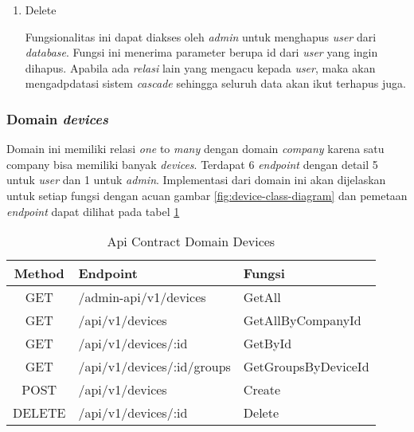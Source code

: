 \begin{enumerate}
        Fungsionalitas ini menerima masukan berupa json yang dengan \textit{field} \textit{name}, \textit{email}, \textit{password}, serta \textit{company\textunderscore id} dari \textit{requester}. Seluruh \textit{field} tersebut digunakan untuk membuat objek user pada \textit{database}. Pada fungsi ini akan dilakukan pengecekan apakah \textit{email} valid dan \textit{unique}. Selain itu ada validasi \textit{company\textunderscore id} agar dipastikan bahwa \textit{user} benar terdaftar ke \textit{company} yang sesuai. Apabila validasi tidak berhasil maka akan dikeluarkan pesan error, namun jika semua berhasil dilewati maka akan dikembalikan \textit{response} berupa \textit{user} yang telah dibuat pada database.

  \item Delete

        Fungsionalitas ini dapat diakses oleh \textit{admin} untuk menghapus \textit{user} dari \textit{database}. Fungsi ini menerima parameter berupa id dari \textit{user} yang ingin dihapus. Apabila ada \textit{relasi} lain yang mengacu kepada \textit{user}, maka akan mengadpdatasi sistem \textit{cascade} sehingga seluruh data akan ikut terhapus juga.

\end{enumerate}

\subsubsection{Domain \textit{devices}}

Domain ini memiliki relasi \textit{one} to \textit{many} dengan domain \textit{company} karena satu company bisa memiliki banyak \textit{devices}. Terdapat 6 \textit{endpoint} dengan detail 5 untuk \textit{user} dan 1 untuk \textit{admin}. Implementasi dari domain ini akan dijelaskan untuk setiap fungsi dengan acuan gambar \ref{fig:device-class-diagram} dan pemetaan \textit{endpoint} dapat dilihat pada tabel \ref{tab:api-contract-domain-device}

\bgroup
\begin{table}[ht]
  \caption{Api Contract Domain Devices}
  \label{tab:api-contract-domain-device}
  \def\arraystretch{1.7}
  \centering
  \begin{tabular}{|c|p{6cm}|p{4cm}|}
    \hline
    Method & Endpoint                   &
    Fungsi                                                    \\
    \hline
    GET    & /admin-api/v1/devices      & GetAll              \\
    \hline
    GET    & /api/v1/devices            & GetAllByCompanyId   \\
    \hline
    GET    & /api/v1/devices/:id        & GetById             \\
    \hline
    GET    & /api/v1/devices/:id/groups & GetGroupsByDeviceId \\
    \hline
    POST   & /api/v1/devices            & Create              \\
    \hline
    DELETE & /api/v1/devices/:id        & Delete              \\
    \hline
  \end{tabular}
\end{table}
\egroup


